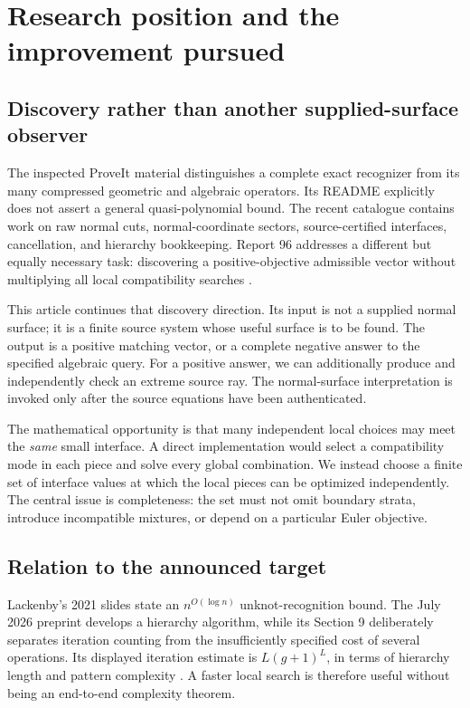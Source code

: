 \documentclass[11pt,a4paper]{article}
\theoremstyle{definition}
\theoremstyle{remark}
\begin{document}
\section{Research position and the improvement pursued}
\label{sec:position}

\subsection{Discovery rather than another supplied-surface observer}
The inspected ProveIt material distinguishes a complete exact recognizer from its many compressed geometric and algebraic operators. Its README explicitly does not assert a general quasi-polynomial bound. The recent catalogue contains work on raw normal cuts, normal-coordinate sectors, source-certified interfaces, cancellation, and hierarchy bookkeeping. Report 96 addresses a different but equally necessary task: discovering a positive-objective admissible vector without multiplying all local compatibility searches \cite{repo,scalar}.

This article continues that discovery direction. Its input is not a supplied normal surface; it is a finite source system whose useful surface is to be found. The output is a positive matching vector, or a complete negative answer to the specified algebraic query. For a positive answer, we can additionally produce and independently check an extreme source ray. The normal-surface interpretation is invoked only after the source equations have been authenticated.

The mathematical opportunity is that many independent local choices may meet the \emph{same} small interface. A direct implementation would select a compatibility mode in each piece and solve every global combination. We instead choose a finite set of interface values at which the local pieces can be optimized independently. The central issue is completeness: the set must not omit boundary strata, introduce incompatible mixtures, or depend on a particular Euler objective.

\subsection{Relation to the announced target}
Lackenby's 2021 slides state an $n^{O(\log n)}$ unknot-recognition bound. The July 2026 preprint develops a hierarchy algorithm, while its Section 9 deliberately separates iteration counting from the insufficiently specified cost of several operations. Its displayed iteration estimate is $L(g+1)^L$, in terms of hierarchy length and pattern complexity \cite{slides,lack2026}. A faster local search is therefore useful without being an end-to-end complexity theorem.
\end{document}
